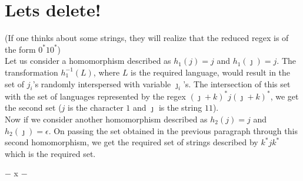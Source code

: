 \documentclass[11pt,letterpaper]{article}
\begin{document}
\section{Lets delete!}
(If one thinks about some strings, they will realize that the reduced regex is of the form $0^*10^*$) \\
Let us consider a homomorphism described as $h_1(j) = j$ and $h_1(\jmath) = j$. The transformation $h_1^{-1}(L)$, where $L$ is the required language, would result in the set of $j_i$'s randomly interspersed with variable $\jmath_i$'s.
The intersection of this set with the set of languages represented by the regex $(\jmath+k)^*j(\jmath+k)^*$, we get the second set ($j$ is the character $1$ and $\jmath$ is the string $11$). \\
Now if we consider another homomorphism described as $h_2(j) = j$ and $h_2(\jmath) = \epsilon$. On passing the set obtained in the previous paragraph through this second homomorphism, we get the required set of strings described by $k^*jk^*$ which is the required set.
\\
\begin{center}
    $-$ x $-$
\end{center}
\end{document}

